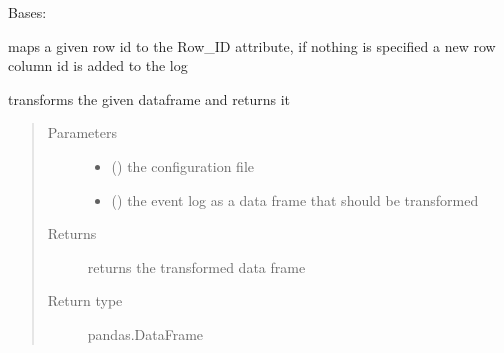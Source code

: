 \documentclass[letterpaper,10pt,english]{sphinxmanual}
\begin{document}

\begin{fulllineitems}
\label{\detokenize{event_log_analyzer:event_log_analyzer.adapter.RowIDAdder}}
\sphinxAtStartPar
Bases: {\hyperref[\detokenize{event_log_analyzer:event_log_analyzer.adapter.Adapter}]{}}

\sphinxAtStartPar
maps a given row id to the Row\_ID attribute, if nothing is specified a new row column id is added to the log

\begin{fulllineitems}
\label{\detokenize{event_log_analyzer:event_log_analyzer.adapter.RowIDAdder.transform}}
\sphinxAtStartPar
transforms the given dataframe and returns it
\begin{quote}\begin{description}
\item[{Parameters}] \leavevmode\begin{itemize}
\item {} 
\sphinxAtStartPar
{} () \textendash{} the configuration file

\item {} 
\sphinxAtStartPar
{} () \textendash{} the event log as a data frame that should be transformed

\end{itemize}

\item[{Returns}] \leavevmode
\sphinxAtStartPar
returns the transformed data frame

\item[{Return type}] \leavevmode
\sphinxAtStartPar
pandas.DataFrame

\end{description}\end{quote}

\end{fulllineitems}


\end{fulllineitems}
\end{document}
